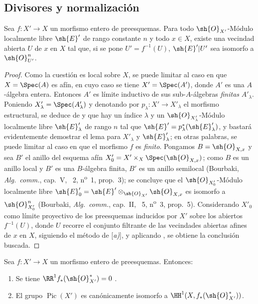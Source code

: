 \subsection{Divisores y normalización}
\label{subsection:IV.21.8}

\begin{lemma}[21.8.1]
\label{IV.21.8.1}
Sea $f:X'\to X$ un morfismo entero de preesquemas.
Para todo $\sh{O}_{X'}$-Módulo localmente libre $\sh{E}'$ de rango constante $n$ y todo $x\in X$, existe una vecindad abierta $U$ de $x$ en $X$ tal que, si se pone $U'=f^{-1}(U)$, $\sh{E}'|U'$ sea isomorfo a $\sh{O}_{U'}^n$.
\end{lemma}

\begin{proof}
Como la cuestión es local sobre $X$, se puede limitar al caso en que $X=\Spec(A)$ es afín, en cuyo caso se tiene $X'=\Spec(A')$, donde $A'$ es una $A$-álgebra entera.
Entonces $A'$ es límite inductivo de sus sub-$A$-álgebras \emph{finitas} $A'_\lambda$.
Poniendo $X'_\lambda=\Spec(A'_\lambda)$ y denotando por $p_\lambda:X'\to X'_\lambda$ el morfismo estructural, se deduce de  y  que hay un índice $\lambda$ y un $\sh{O}_{X'_\lambda}$-Módulo localmente libre $\sh{E}'_\lambda$ de rango $n$ tal que $\sh{E}'=p_\lambda^*(\sh{E}'_\lambda)$, y bastará evidentemente demostrar el lema para $X'_\lambda$ y $\sh{E}'_\lambda$;
en otras palabras, se puede limitar al caso en que el morfismo $f$ es \emph{finito}.
Pongamos $B=\sh{O}_{X,x}$ y sea $B'$ el anillo del esquema afín $X'_0=X'\times_X\Spec(\sh{O}_{X,x})$;
como $B$ es un anillo local y $B'$ es una $B$-álgebra finita, $B'$ es un anillo semilocal (Bourbaki, \emph{Alg.\ comm.}, cap.~V, \textsection~2, n\textsuperscript{o}~1, prop.~3);
se concluye que el $\sh{O}_{X'_0}$-Módulo localmente libre $\sh{E}'_0=\sh{E}'\otimes_{\sh{O}_{X'}}\sh{O}_{X,x}$ es isomorfo a $\sh{O}_{X'_0}^n$ (Bourbaki, \emph{Alg.\ comm.}, cap.~II, \textsection~5, n\textsuperscript{o}~3, prop.~5).
Considerando $X'_0$ como límite
proyectivo de los preesquemas inducidos por $X'$ sobre los abiertos $f^{-1}(U)$, donde $U$ recorre el conjunto filtrante de las vecindades abiertas afines de $x$ en $X$, siguiendo el método de [\emph{a)}], y aplicando , se obtiene la conclusión buscada.
\end{proof}

\begin{corollary}[21.8.2]
\label{IV.21.8.2}
Sea $f:X'\to X$ un morfismo entero de preesquemas.
Entonces:
\begin{enumerate}[label=\textup{(\roman*)}]
  \item Se tiene $\RR^1 f_*(\sh{O}^*_{X'})=0$ .
  \item El grupo $\operatorname{Pic}(X')$ es canónicamente isomorfo a $\HH^1(X,f_*(\sh{O}^*_{X'}))$.
\end{enumerate}
\end{corollary}

